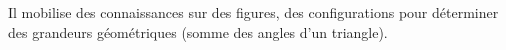 \begin{prerequis}    
    \small
    Il mobilise des connaissances sur des figures, des configurations pour déterminer des grandeurs géométriques (somme des angles d'un triangle).
\end{prerequis}